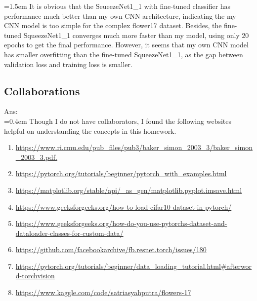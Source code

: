 \documentclass{article}
\begin{document}
	\hangindent=1.5em \hspace{1.5em}It is obvious that the SeueezeNet1\_1 with fine-tuned classifier has performance much better than my own CNN architecture, indicating the my CNN model is too simple for the complex flower17 dataset. Besides, the fine-tuned SqueezeNet1\_1 converges much more faster than my model, using only 20 epochs to get the final performance. However, it seems that my own CNN model has smaller overfitting than the fine-tuned SqueezeNet1\_1, as the gap between validation loss and training loss is smaller.

	\newpage
	\subsection*{Collaborations}
	Ans:\\
	\hangindent=0.4em \hspace{0.3em} Though I do not have collaborators, I found the following websites helpful on understanding the concepts in this homework.
	\begin{enumerate}
		\item \url{https://www.ri.cmu.edu/pub_files/pub3/baker_simon_2003_3/baker_simon_2003_3.pdf.}
		\item \url{https://pytorch.org/tutorials/beginner/pytorch_with_examples.html}
		\item \url{https://matplotlib.org/stable/api/_as_gen/matplotlib.pyplot.imsave.html}	
		\item \url{https://www.geeksforgeeks.org/how-to-load-cifar10-dataset-in-pytorch/}	
		\item \url{https://www.geeksforgeeks.org/how-do-you-use-pytorchs-dataset-and-dataloader-classes-for-custom-data/}
		\item \url{https://github.com/facebookarchive/fb.resnet.torch/issues/180}
		\item \url{https://pytorch.org/tutorials/beginner/data_loading_tutorial.html#afterword-torchvision}
		\item \url{https://www.kaggle.com/code/satriasyahputra/flowers-17}
	\end{enumerate}
\end{document}
